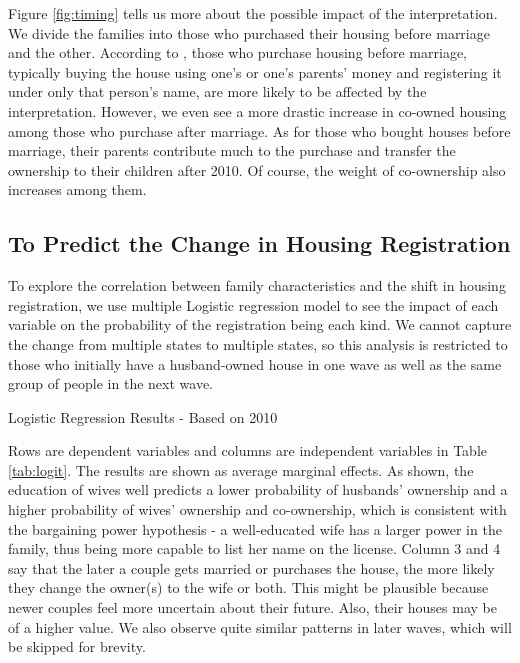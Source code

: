 \documentclass[11pt]{article}
\begin{document}
Figure \ref{fig:timing} tells us more about the possible impact of the interpretation. We divide the families into those who purchased their housing before marriage and the other. According to \citet{Huang532}, those who purchase housing before marriage, typically buying the house using one's or one's parents' money and registering it under only that person's name, are more likely to be affected by the interpretation. However, we even see a more drastic increase in co-owned housing among those who purchase after marriage. As for those who bought houses before marriage, their parents contribute much to the purchase and transfer the ownership to their children after 2010. Of course, the weight of co-ownership also increases among them.

\subsection{To Predict the Change in Housing Registration}

To explore the correlation between family characteristics and the shift in housing registration, we use multiple Logistic regression model to see the impact of each variable on the probability of the registration being each kind. We cannot capture the change from multiple states to multiple states, so this analysis is restricted to those who initially have a husband-owned house in one wave as well as the same group of people in the next wave. 

\begin{table}[h]
    \centering
    \caption{Logistic Regression Results - Based on 2010}
    \label{tab:logit}
    

\end{table}

Rows are dependent variables and columns are independent variables in Table \ref{tab:logit}. The results are shown as average marginal effects. As shown, the education of wives well predicts a lower probability of husbands' ownership and a higher probability of wives' ownership and co-ownership, which is consistent with the bargaining power hypothesis - a well-educated wife has a larger power in the family, thus being more capable to list her name on the license. Column 3 and 4 say that the later a couple gets married or purchases the house, the more likely they change the owner(s) to the wife or both. This might be plausible because newer couples feel more uncertain about their future. Also, their houses may be of a higher value. We also observe quite similar patterns in later waves, which will be skipped for brevity.
\end{document}

